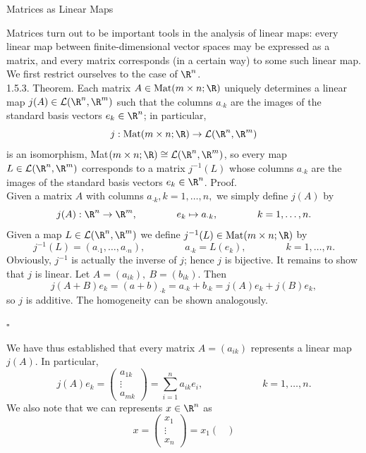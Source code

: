 \documentclass[smaller,hyperref={CJKbookmarks=true}]{beamer}
\begin{document}
\begin{frame}{Matrices as Linear Maps}
\begin{spacing}{1}
Matrices turn out to be important tools in the analysis of linear maps:
every linear map between finite-dimensional vector spaces may be expressed as a matrix, and every matrix corresponds (in a certain way) to some such linear map. We first restrict ourselves to the case of $\R^n$.\\[12pt]
\alert{1.5.3. Theorem.} Each matrix $A\in\text{Mat}(m\times n;\R)$ uniquely determines a linear map $j(A)\in\mathcal{L}(\R^n,\R^m)$ such that the columns $a_{\cdot k}$ are the images of the standard basis vectors $e_k\in\R^n$; in particular,
\[j:\text{Mat}(m\times n;\R)\to\mathcal{L}(\R^n,\R^m)\]
is an isomorphism, Mat$(m\times n;\R)\cong\mathcal{L}(\R^n,\R^m)$, so every map $L\in\mathcal{L}(\R^n,\R^m)$ corresponds to a matrix $j^{-1}(L)$ whose columns $a_{\cdot k}$ are the images of the standard basis vectors $e_k\in\R^n$.
\newpage
\alert{Proof.}\\
Given a matrix $A$ with columns $a_{\cdot k},k=1,\ldots,n,$ we simply define $j(A)$ by
\[j(A):\R^n\to\R^m,\qquad\qquad e_k\mapsto a_{\cdot k},\qquad\qquad k=1,\ldots,n.\]
Given a map $L\in\mathcal{L}(\R^n,\R^m)$ we define $j^{-1}(L)\in\text{Mat}(m\times n;\R)$ by
\[j^{-1}(L)=(a_{\cdot1},\ldots,a_{\cdot n}),\qquad\qquad a_{\cdot k}=L(e_k),\qquad\qquad k=1,\ldots,n.\]
Obviously, $j^{-1}$ is actually the inverse of $j$; hence $j$ is bijective. It remains to show that $j$ is linear. Let $A=(a_{ik}),~B=(b_{ik})$. Then
\[j(A+B)e_k=(a+b)_{\cdot k}=a_{\cdot k}+b_{\cdot k}=j(A)e_k+j(B)e_k,\]
so $j$ is additive. The homogeneity can be shown analogously.
\begin{flushright}
  $\square$
\end{flushright}
\newpage
We have thus established that every matrix $A=(a_{ik})$ represents a linear map $j(A)$. In particular,
\[j(A)e_k=\begin{pmatrix}
            a_{1k} \\
            \vdots \\
            a_{mk}
          \end{pmatrix}=\sum_{i=1}^{n}a_{ik}e_i,\qquad\qquad\qquad k=1,\ldots,n.\]
We also note that we can represents $x\in\R^n$ as
\[x=\begin{pmatrix}
      x_1 \\
      \vdots \\
      x_n
    \end{pmatrix}=x_1\begin{pmatrix}

\end{pmatrix}\]
\end{spacing}
\end{frame}
\end{document}
